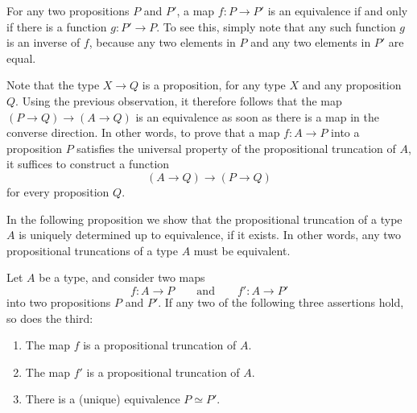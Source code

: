 \begin{rmk}\label{rmk:simplified-up-trunc-Prop}
  For any two propositions $P$ and $P'$, a map $f:P\to P'$ is an equivalence if and only if there is a function $g:P'\to P$. To see this, simply note that any such function $g$ is an inverse of $f$, because any two elements in $P$ and any two elements in $P'$ are equal. 
  
  Note that the type $X\to Q$ is a proposition, for any type $X$ and any proposition $Q$. Using the previous observation, it therefore follows that the map $(P\to Q)\to (A\to Q)$ is an equivalence as soon as there is a map in the converse direction. In other words, to prove that a map $f:A\to P$ into a proposition $P$ satisfies the universal property of the propositional truncation of $A$, it suffices to construct a function
  \begin{equation*}
    (A\to Q)\to (P\to Q)
  \end{equation*}
  for every proposition $Q$.
\end{rmk}

In the following proposition we show that the propositional truncation of a type $A$ is uniquely determined up to equivalence, if it exists. In other words, any two propositional truncations of a type $A$ must be equivalent.

\begin{prp}
  Let $A$ be a type, and consider two maps
  \begin{equation*}
    f:A\to P \qquad\text{and}\qquad f':A\to P'
  \end{equation*}
  into two propositions $P$ and $P'$. If any two of the following three assertions hold, so does the third:
  \begin{enumerate}
  \item\label{item:f-up-trunc-Prop} The map $f$ is a propositional truncation of $A$.
  \item\label{item:f-up-trunc-Prop'} The map $f'$ is a propositional truncation of $A$.
  \item\label{item:equiv-Prop} There is a (unique) equivalence $P\simeq P'$.
  \end{enumerate}
\end{prp}

